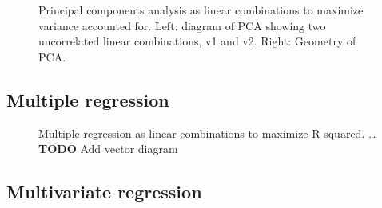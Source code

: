 \documentclass[
  letterpaper,
  10pt,
  krantz2]{krantz}
\begin{document}
{\begin{figure}
{}

\caption{\label{fig-lin-comb-pca}Principal components analysis as linear
combinations to maximize variance accounted for. Left: diagram of PCA
showing two uncorrelated linear combinations, v1 and v2. Right: Geometry
of PCA.}

\end{figure}%

\subsection{Multiple regression}\label{multiple-regression}

\begin{figure}


\caption{\label{fig-lin-comb2}Multiple regression as linear combinations
to maximize R squared. \ldots{} \textbf{TODO} Add vector diagram}

\end{figure}%

\subsection{Multivariate regression}\label{multivariate-regression}

\begin{figure}

\end{figure}}
\end{document}
